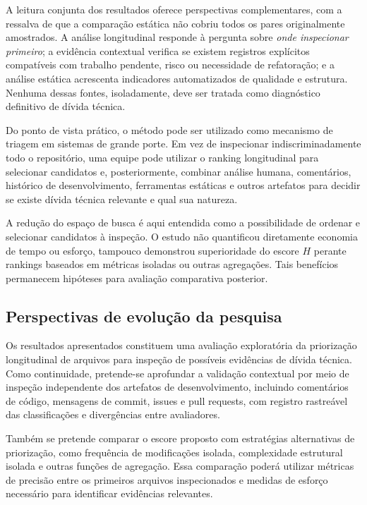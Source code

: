 \documentclass[12pt]{article}
\begin{document}
A leitura conjunta dos resultados oferece perspectivas complementares, com a ressalva de que a comparação estática não cobriu todos os pares originalmente amostrados. A análise longitudinal responde à pergunta sobre \emph{onde inspecionar primeiro}; a evidência contextual verifica se existem registros explícitos compatíveis com trabalho pendente, risco ou necessidade de refatoração; e a análise estática acrescenta indicadores automatizados de qualidade e estrutura. Nenhuma dessas fontes, isoladamente, deve ser tratada como diagnóstico definitivo de dívida técnica.

Do ponto de vista prático, o método pode ser utilizado como mecanismo de triagem em sistemas de grande porte. Em vez de inspecionar indiscriminadamente todo o repositório, uma equipe pode utilizar o ranking longitudinal para selecionar candidatos e, posteriormente, combinar análise humana, comentários, histórico de desenvolvimento, ferramentas estáticas e outros artefatos para decidir se existe dívida técnica relevante e qual sua natureza.

A redução do espaço de busca é aqui entendida como a possibilidade de ordenar e selecionar candidatos à inspeção. O estudo não quantificou diretamente economia de tempo ou esforço, tampouco demonstrou superioridade do escore $H$ perante rankings baseados em métricas isoladas ou outras agregações. Tais benefícios permanecem hipóteses para avaliação comparativa posterior.

\subsection{Perspectivas de evolução da pesquisa}

Os resultados apresentados constituem uma avaliação exploratória da priorização longitudinal de arquivos para inspeção de possíveis evidências de dívida técnica. Como continuidade, pretende-se aprofundar a validação contextual por meio de inspeção independente dos artefatos de desenvolvimento, incluindo comentários de código, mensagens de commit, issues e pull requests, com registro rastreável das classificações e divergências entre avaliadores.

Também se pretende comparar o escore proposto com estratégias alternativas de priorização, como frequência de modificações isolada, complexidade estrutural isolada e outras funções de agregação. Essa comparação poderá utilizar métricas de precisão entre os primeiros arquivos inspecionados e medidas de esforço necessário para identificar evidências relevantes.
\end{document}
